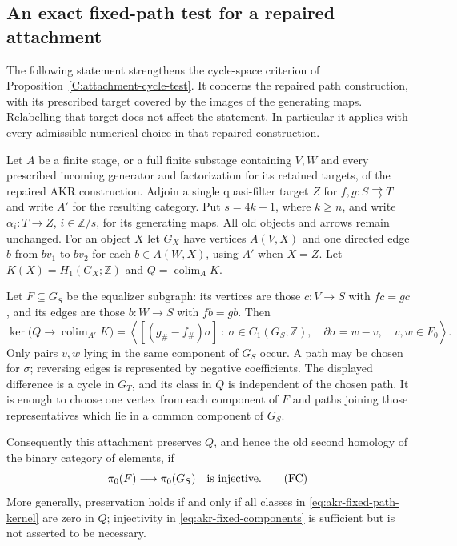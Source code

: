 \subsection{An exact fixed-path test for a repaired attachment}

The following statement strengthens the cycle-space criterion of
Proposition~\ref{C:attachment-cycle-test}. It concerns the repaired
path construction, with its prescribed target covered by the images of
the generating maps. Relabelling that target does not affect the
statement. In particular it applies with every admissible numerical
choice in that repaired construction.

\begin{proposition}
\label{C:fixed-path-kernel}
Let $A$ be a finite stage, or a full finite substage containing $V,W$
and every prescribed incoming generator and factorization for its
retained targets, of the repaired AKR construction. Adjoin a
single quasi-filter target $Z$ for $f,g:S\rightrightarrows T$ and write
$A'$ for the resulting category. Put $s=4k+1$, where $k\geq n$, and
write $\alpha_i:T\to Z$, $i\in\mathbb Z/s$, for its generating maps.
All old objects and arrows remain unchanged. For an object $X$ let
$G_X$ have vertices $A(V,X)$ and one directed edge $b$ from $bv_1$ to
$bv_2$ for each $b\in A(W,X)$, using $A'$ when $X=Z$. Let
$K(X)=H_1(G_X;\mathbb Z)$ and $Q=\operatorname{colim}_A K$.

Let $F\subseteq G_S$ be the equalizer subgraph: its vertices are those
$c:V\to S$ with $fc=gc$, and its edges are those $b:W\to S$ with
$fb=gb$. Then
\[
 \ker\bigl(Q\longrightarrow\operatorname{colim}_{A'}K\bigr)
 =\left\langle [(g_\#-f_\#)\sigma]\ :\
  \sigma\in C_1(G_S;\mathbb Z),\quad
  \partial\sigma=w-v,\quad v,w\in F_0\right\rangle.
 \tag{FP}\label{eq:akr-fixed-path-kernel}
\]
Only pairs $v,w$ lying in the same component of $G_S$ occur. A path may
be chosen for $\sigma$; reversing edges is represented by negative
coefficients. The displayed difference is a cycle in $G_T$, and its
class in $Q$ is independent of the chosen path. It is enough to choose
one vertex from each component of $F$ and paths joining those
representatives which lie in a common component of $G_S$.

Consequently this attachment preserves $Q$, and hence the old second
homology of the binary category of elements, if
\[
 \pi_0(F)\longrightarrow\pi_0(G_S)
 \quad\hbox{is injective}.
 \tag{FC}\label{eq:akr-fixed-components}
\]
More generally, preservation holds if and only if all classes in
\eqref{eq:akr-fixed-path-kernel} are zero in $Q$; injectivity in
\eqref{eq:akr-fixed-components} is sufficient but is not asserted to be
necessary.
\end{proposition}

